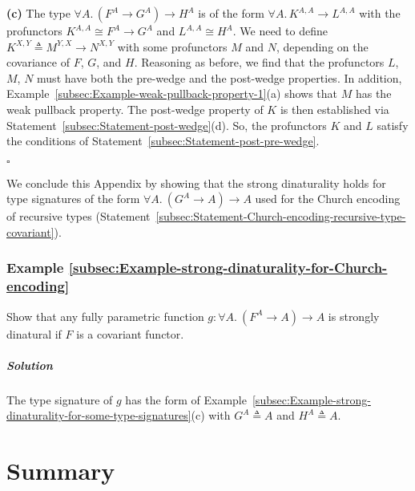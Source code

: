 \textbf{(c)} The type $\forall A.\,(F^{A}\rightarrow G^{A})\rightarrow H^{A}$
is of the form $\forall A.\,K^{A,A}\rightarrow L^{A,A}$ with the
profunctors $K^{A,A}\cong F^{A}\rightarrow G^{A}$ and $L^{A,A}\cong H^{A}$.
We need to define $K^{X,Y}\triangleq M^{Y,X}\rightarrow N^{X,Y}$
with some profunctors $M$ and $N$, depending on the covariance of
$F$, $G$, and $H$. Reasoning as before, we find that the profunctors
$L$, $M$, $N$ must have both the pre-wedge and the post-wedge properties.
In addition, Example~\ref{subsec:Example-weak-pullback-property-1}(a)
shows that $M$ has the weak pullback property. The post-wedge property
of $K$ is then established via Statement~\ref{subsec:Statement-post-wedge}(d).
So, the profunctors $K$ and $L$ satisfy the conditions of Statement~\ref{subsec:Statement-post-pre-wedge}.

$\square$

We conclude this Appendix by showing that the strong dinaturality
holds for type signatures of the form $\forall A.\ (G^{A}\rightarrow A)\rightarrow A$
used for the Church encoding of recursive types (Statement~\ref{subsec:Statement-Church-encoding-recursive-type-covariant}).

\subsubsection{Example \label{subsec:Example-strong-dinaturality-for-Church-encoding}\ref{subsec:Example-strong-dinaturality-for-Church-encoding}}

Show that any fully parametric function $g:\forall A.\ (F^{A}\rightarrow A)\rightarrow A$
is strongly dinatural if $F$ is a covariant functor.

\subparagraph{Solution}

The type signature of $g$ has the form of Example~\ref{subsec:Example-strong-dinaturality-for-some-type-signatures}(c)
with $G^{A}\triangleq A$ and $H^{A}\triangleq A$.

\section{Summary}


